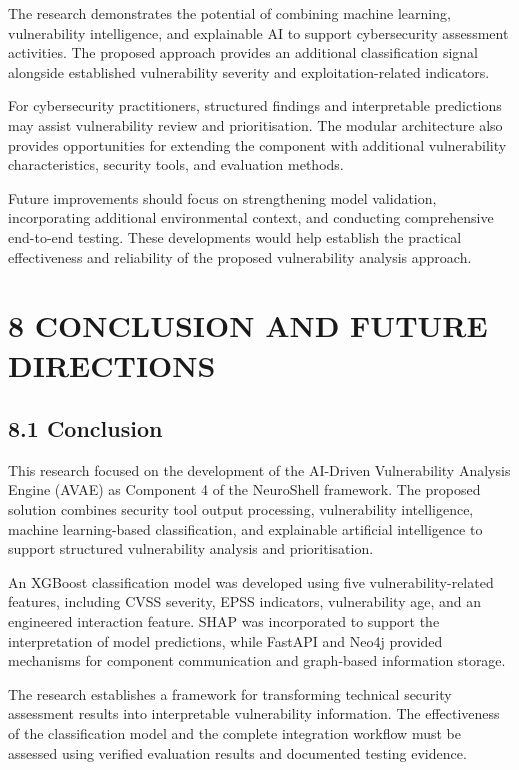 \documentclass[
]{article}
\begin{document}
The research demonstrates the potential of combining machine learning,
vulnerability intelligence, and explainable AI to support cybersecurity
assessment activities. The proposed approach provides an additional
classification signal alongside established vulnerability severity and
exploitation-related indicators.

For cybersecurity practitioners, structured findings and interpretable
predictions may assist vulnerability review and prioritisation. The
modular architecture also provides opportunities for extending the
component with additional vulnerability characteristics, security tools,
and evaluation methods.

Future improvements should focus on strengthening model validation,
incorporating additional environmental context, and conducting
comprehensive end-to-end testing. These developments would help
establish the practical effectiveness and reliability of the proposed
vulnerability analysis approach.

\hypertarget{conclusion-and-future-directions}{%
\section{8 CONCLUSION AND FUTURE
DIRECTIONS}\label{conclusion-and-future-directions}}

\hypertarget{conclusion}{%
\subsection{\texorpdfstring{ 8.1
Conclusion}{ 8.1 Conclusion}}\label{conclusion}}

This research focused on the development of the AI-Driven Vulnerability
Analysis Engine (AVAE) as Component 4 of the NeuroShell framework. The
proposed solution combines security tool output processing,
vulnerability intelligence, machine learning-based classification, and
explainable artificial intelligence to support structured vulnerability
analysis and prioritisation.

An XGBoost classification model was developed using five
vulnerability-related features, including CVSS severity, EPSS
indicators, vulnerability age, and an engineered interaction feature.
SHAP was incorporated to support the interpretation of model
predictions, while FastAPI and Neo4j provided mechanisms for component
communication and graph-based information storage.

The research establishes a framework for transforming technical security
assessment results into interpretable vulnerability information. The
effectiveness of the classification model and the complete integration
workflow must be assessed using verified evaluation results and
documented testing evidence.
\end{document}
